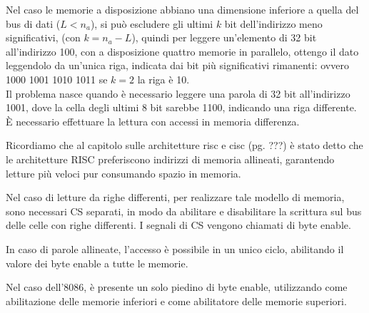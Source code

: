 \documentclass[../template]{subfiles}
\begin{document}
Nel caso le memorie a disposizione abbiano una dimensione inferiore a quella del bus di dati ($L < n_a$), si può escludere gli ultimi $k$ bit dell'indirizzo meno significativi, (con $k = n_a - L$), quindi per leggere un'elemento di 32 bit all'indirizzo 100, con a disposizione quattro memorie in parallelo, ottengo il dato leggendolo da un'unica riga, indicata dai bit più significativi rimanenti: ovvero 1000 1001 1010 1011 se $k = 2$ la riga è 10.
\\
Il problema nasce quando è necessario leggere una parola di 32 bit all'indirizzo 1001, dove la cella degli ultimi 8 bit sarebbe 1100, indicando una riga differente. È necessario effettuare la lettura con accessi in memoria differenza.

Ricordiamo che al capitolo sulle architetture risc e cisc (pg. ???) è stato detto che le architetture RISC preferiscono indirizzi di memoria allineati, garantendo letture più veloci pur consumando spazio in memoria.

Nel caso di letture da righe differenti, per realizzare tale modello di memoria, sono necessari CS separati, in modo da abilitare e disabilitare la scrittura sul bus delle celle con righe differenti. I segnali di CS vengono chiamati di byte enable.

In caso di parole allineate, l'accesso è possibile in un unico ciclo, abilitando il valore dei byte enable a tutte le memorie.

Nel caso dell'8086, è presente un solo piedino di byte enable, utilizzando  come abilitazione delle memorie inferiori e  come abilitatore delle memorie superiori.

\end{document}
